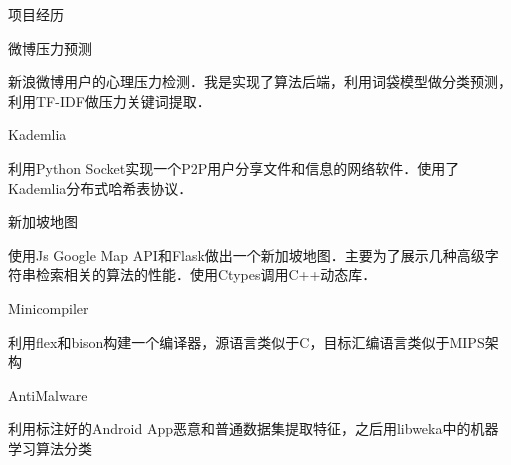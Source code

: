 \documentclass{resume} %
\begin{document}
\begin{rSection}{项目经历}
\begin{sSubsection}{微博压力预测}{}
\item 新浪微博用户的心理压力检测．我是实现了算法后端，利用词袋模型做分类预测，利用TF-IDF做压力关键词提取．
\end{sSubsection}
\vspace{-0.8em}
\begin{sSubsection}{Kademlia}{}
\item 利用Python Socket实现一个P2P用户分享文件和信息的网络软件．使用了Kademlia分布式哈希表协议．
\end{sSubsection}
\vspace{-0.8em}
\begin{sSubsection}{新加坡地图}{}
\item 使用Js Google Map API和Flask做出一个新加坡地图．主要为了展示几种高级字符串检索相关的算法的性能．使用Ctypes调用C++动态库．
\end{sSubsection}
\vspace{-0.8em}
\begin{sSubsection}{Minicompiler}{}
\item 利用flex和bison构建一个编译器，源语言类似于C，目标汇编语言类似于MIPS架构
\end{sSubsection}
\vspace{-0.8em}
\begin{sSubsection}{AntiMalware}{}
\item 利用标注好的Android App恶意和普通数据集提取特征，之后用libweka中的机器学习算法分类
\end{sSubsection}
\vspace{-0.8em}
\end{rSection}
\end{document}
